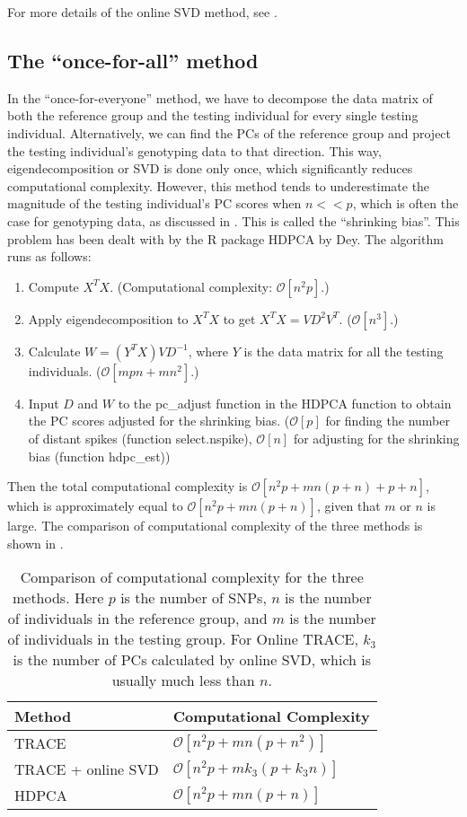 \documentclass{article}[12pt]
\newcommand{\bO}{\mathcal{O}}
\begin{document}
For more details of the online SVD method, see \cite{brand}.

\subsection{The ``once-for-all'' method}

In the ``once-for-everyone'' method,
we have to decompose the data matrix of both the reference group and the testing individual for every single testing individual.
Alternatively, we can find the PCs of the reference group and project the testing individual's genotyping data to that direction.
This way, eigendecomposition or SVD is done only once,
which significantly reduces computational complexity.
However, this method tends to underestimate the magnitude of the testing individual's PC scores when $n << p$,
which is often the case for genotyping data,
as discussed in \cite{dey}.
This is called the ``shrinking bias''.
This problem has been dealt with by the R package HDPCA by Dey.
The algorithm runs as follows:

\begin{enumerate}
\item Compute $X^T X$.
  (Computational complexity: $\bO[n^2p]$.)  
\item Apply eigendecomposition to $X^T X$ to get $X^T X = V D^2 V^T$.
  ($\bO[n^3]$.)
\item Calculate $W = (Y^T X) V D^{-1}$, where $Y$ is the data matrix for all the testing individuals. ($\bO[mpn + mn^2]$.)
  \item Input $D$ and $W$ to the pc\_adjust function in the HDPCA function to obtain the PC scores adjusted for the shrinking bias. ($\bO[p]$ for finding the number of distant spikes (function select.nspike), $\bO[n]$ for adjusting for the shrinking bias (function hdpc\_est))
\end{enumerate}

Then the total computational complexity is $\bO[n^2p + mn(p + n) + p + n]$,
which is approximately equal to $\bO[n^2p + mn(p+n)]$,
given that $m$ or $n$ is large.
The comparison of computational complexity of the three methods is shown in .

\begin{table} 
  \centering
  \begin{tabular}{|l|l|}
    \hline
    Method & Computational Complexity \\ 
    \hline
    TRACE & $\bO[n^2 p + mn(p + n^2)]$ \\
    \hline
    TRACE + online SVD & $\bO[n^2 p + mk_3(p + k_3 n)]$ \\
    \hline
    HDPCA & $\bO[n^2p + mn(p+n)]$ \\
    \hline
  \end{tabular}
  \caption{
    Comparison of computational complexity for the three methods.
    Here $p$ is the number of SNPs,
    $n$ is the number of individuals in the reference group,
    and $m$ is the number of individuals in the  testing group.
    For Online TRACE, $k_3$ is the number of PCs calculated by online SVD, which is usually much less than $n$.}
  \label{tbl:cplx}
\end{table}
\end{document}
